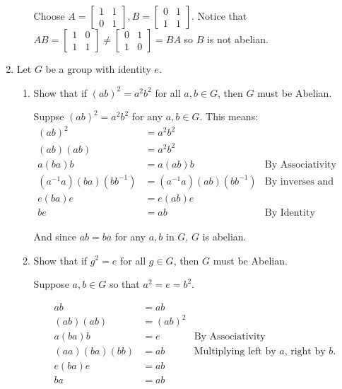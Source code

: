 \documentclass{article}
\begin{document}
\begin{enumerate}
\begin{enumerate}[label= (\alph*)]
            Choose $A=\begin{bmatrix} 1&1\\0&1 \end{bmatrix}, B=\begin{bmatrix}0&1\\1&1\end{bmatrix}$.
            Notice that $AB=\begin{bmatrix} 1&0\\1&1 \end{bmatrix}\neq
            \begin{bmatrix} 0&1\\1&0 \end{bmatrix} =BA$ so $B$ is not abelian.
    \end{enumerate}
\item Let $G$ be a group with identity $e$.
    \begin{enumerate}[label= (\alph*)] 
        \item Show that if $(ab)^2 = a^2 b^2$ for all $a, b \in  G$, then $G$ must be Abelian.

            Suppse $(ab)^2=a^2b^2$ for any $a,b\in G$. This means:
            \begin{align*}
                (ab)^2&=a^2b^2\\
                (ab)(ab)&=a^2b^2\\
                a(ba)b&= a(ab)b & \text{By Associativity}\\
                (a^{-1}a)(ba)(bb^{-1})&= (a^{-1}a)(ab)(bb^{-1})&\text{By inverses and Asoociativity}\\ 
                e(ba)e&= e(ab)e \\
                be&= ab&\text{By Identity} 
            \end{align*}

            And since $ab=ba$ for any $a,b$ in $G$, $G$ is abelian.

        \item  Show that if $g^2 = e$ for all $g \in  G$, then $G$ must be Abelian.

            Suppose $a,b\in G$ so that $a^2=e=b^2$.

            \begin{align*}
                ab&=ab  \\
                (ab)(ab)&=(ab)^2\\
                a(ba)b&= e &\text{By Associativity}\\ 
                (aa)(ba)(bb)&= ab&\text{Multiplying left by $a$, right by $b$.} \\
                e(ba)e&= ab \\
                ba&=ab
            \end{align*}


\end{enumerate}
\end{enumerate}
\end{document}
